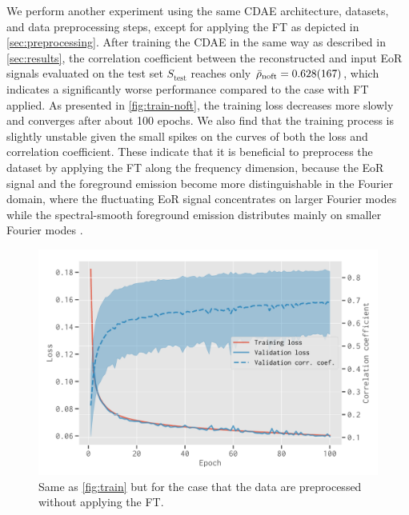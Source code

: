 \documentclass[fleqn,usenatbib]{mnras}
\newcommand{\R}[1]{\mathrm{#1}}
\newcommand{\editone}[1]{{\leavevmode\color{cyan}#1}}
\begin{document}
We perform another experiment using the same CDAE architecture,
datasets, and data preprocessing steps, except for applying the FT
as depicted in \autoref{sec:preprocessing}.
After training the CDAE in the same way as described in
\autoref{sec:results}, \editone{the correlation coefficient between the
reconstructed and input EoR signals evaluated on the test set
$S_{\R{test}}$ reaches only $\bar{\rho}_{\R{noft}} = \num{0.628 +- 0.167}$,
which indicates a significantly worse performance compared to the case with
FT applied.
As presented in \autoref{fig:train-noft}, the training loss decreases more
slowly and converges after about 100 epochs.} %
We also find that the training process is slightly unstable given the small
spikes on the curves of both the loss and correlation coefficient.
These indicate that it is beneficial to preprocess the
dataset by applying the FT along the frequency dimension, because the
EoR signal and the foreground emission become more distinguishable
in the Fourier domain, where the fluctuating EoR signal concentrates on
larger Fourier modes while the spectral-smooth foreground emission
distributes mainly on smaller Fourier modes \citep[e.g.,][]{parsons2012}.

\begin{figure}
  \centering
  \includegraphics[width=\columnwidth]{cdae-train-noft}
  \caption{\label{fig:train-noft}%
    Same as \autoref{fig:train} but for the case that the data are
    preprocessed without applying the FT.
  }
\end{figure}
\end{document}

